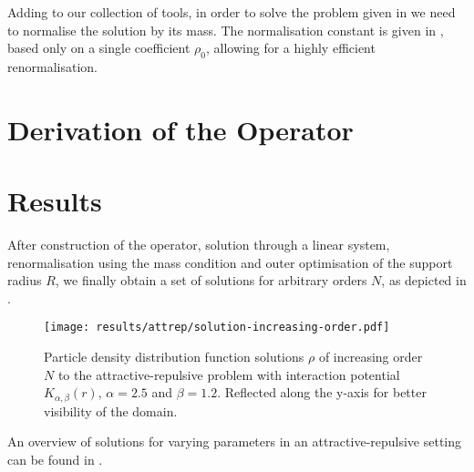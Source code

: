 



Adding to our collection of tools, in order to solve the problem given in  we need to normalise the solution by its mass.
The normalisation constant is given in , based only on a single coefficient $\rho_0$, allowing for a highly efficient renormalisation.


\pagebreak
\section{Derivation of the Operator}




\pagebreak


\section{Results}
After construction of the operator, solution through a linear system, renormalisation using the mass condition and outer optimisation of the support radius $R$, we finally obtain a set of solutions for arbitrary orders $N$, as depicted in .

\begin{figure}[H]
  \centering
  \texttt{[image: results/attrep/solution-increasing-order.pdf]}
  \caption[Solutions of increasing orders]{Particle density distribution function solutions $\rho$ of increasing order $N$ to the attractive-repulsive problem with interaction potential $K_{\alpha, \beta}(r)$, $\alpha = 2.5$ and $\beta = 1.2$. Reflected along the y-axis for better visibility of the domain.}
  \label{fig:solution-increasing-order}
\end{figure}

An overview of solutions for varying parameters in an attractive-repulsive setting can be found in .

